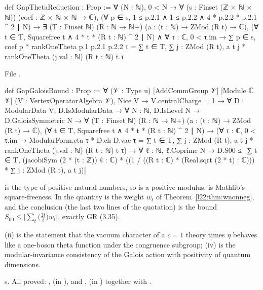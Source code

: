 \begin{leancode}
def GapThetaReduction : Prop :=
  ∀ (N : ℕ), 0 < N → ∀ (s : Finset (ℤ × ℕ × ℕ)) (coef : ℤ × ℕ × ℕ → ℂ),
    (∀ p ∈ s, 1 ≤ p.2.1 ∧ 1 ≤ p.2.2 ∧ 4 * p.2.2 * p.2.1 ^ 2 ∣ N) →
    ∃ (T : Finset ℕ) (R : ℕ → ℕ+) (a : (t : ℕ) → ZMod (R t) → ℂ),
      (∀ t ∈ T, Squarefree t ∧ 4 * t * (R t : ℕ) ^ 2 ∣ N) ∧
      ∀ τ : ℂ, 0 < τ.im → ∑ p ∈ s, coef p * rankOneTheta p.1 p.2.1 p.2.2 τ =
        ∑ t ∈ T, ∑ j : ZMod (R t), a t j * rankOneTheta (j.val : ℕ) (R t : ℕ) t τ
\end{leancode}
\noindent File .
\begin{leancode}
def GapGaloisBound : Prop :=
  ∀ (𝒱 : Type u) [AddCommGroup 𝒱] [Module ℂ 𝒱] (V : VertexOperatorAlgebra 𝒱), Nice V →
    V.centralCharge = 1 → ∀ D : ModularData V, D.IsModularData → ∀ N : ℕ, D.IsLevel N →
      D.GaloisSymmetric N →
      ∀ (T : Finset ℕ) (R : ℕ → ℕ+) (a : (t : ℕ) → ZMod (R t) → ℂ),
        (∀ t ∈ T, Squarefree t ∧ 4 * t * (R t : ℕ) ^ 2 ∣ N) →
        (∀ τ : ℂ, 0 < τ.im → ModularForm.eta τ * D.ch D.vac τ =
          ∑ t ∈ T, ∑ j : ZMod (R t), a t j * rankOneTheta (j.val : ℕ) (R t : ℕ) t τ) →
        ∀ ℓ : ℕ, ℓ.Coprime N →
          D.S00 ≤ ‖∑ t ∈ T, (jacobiSym (2 * (t : ℤ)) ℓ : ℂ) *
            ((1 / ((R t : ℂ) * (Real.sqrt (2 * t) : ℂ))) * ∑ j : ZMod (R t), a t j)‖

\end{leancode}

\begin{dictionary}
 is the type of positive natural numbers, so  is a positive modulus. 
is Mathlib's square-freeness. In  the quantity
 is the weight $w_t$ of
Theorem~\ref{l22:thm:wnonneg}, and the conclusion (the last two lines of the quotation) is the bound
$S_{00}\le\bigl|\sum_t\bigl(\tfrac{2t}{\ell}\bigr)w_t\bigr|$, exactly GR (3.35).
\end{dictionary}

\begin{physics}
(ii) is the statement that the vacuum character of a $c=1$ theory times $\eta$ behaves like a one-boson theta
function under the congruence subgroup; (iv) is the modular-invariance consistency of the Galois action with
positivity of quantum dimensions.
\end{physics}

\begin{status}
s. All proved: ,  (in
), and ,
 (in ) together with .
\end{status}


